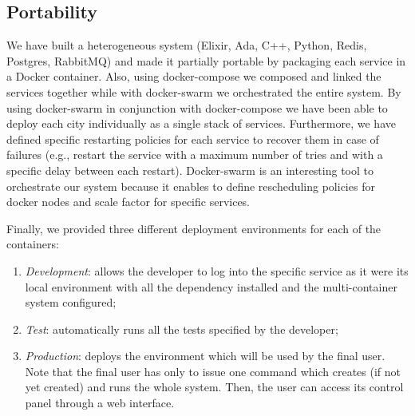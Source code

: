 \subsection{Portability}
We have built a heterogeneous system
(Elixir, Ada, C++, Python, Redis, Postgres, RabbitMQ)
and made it partially portable by packaging each service in a Docker
container.
Also, using docker-compose we composed and linked the services together while with docker-swarm
we orchestrated the entire system. By using docker-swarm in conjunction with docker-compose we
have been able to deploy each city individually as a single stack of services. Furthermore, we
have defined specific restarting policies for each service to recover them in case of failures
(e.g., restart the service with a maximum number of tries and with a specific delay between each restart).
Docker-swarm is an interesting tool to orchestrate our system because it enables to define rescheduling policies
for docker nodes and scale factor for specific services.

Finally, we provided three different deployment environments for each of the
containers:
\begin{enumerate}
  \item \textit{Development}: allows the developer to
    log into the specific service as it were its local environment
    with all the dependency installed and the multi-container system
    configured;
  \item \textit{Test}: automatically runs all the tests specified by
    the developer;
  \item \textit{Production}: deploys the environment which will be used by
    the final user. Note that the final user has only to issue one command
    which creates (if not yet created) and runs the whole system.
    Then, the user can access its control panel through a web interface.
\end{enumerate}
